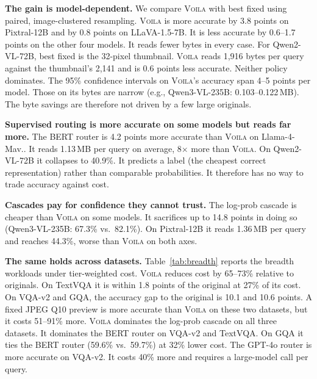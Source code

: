 \documentclass[10pt,conference]{IEEEtran}
\newcommand{\system}{\textsc{Voila}\xspace}
\newcommand{\mLlama}{Llama-4-Mav.\xspace}
\newcommand{\mLlava}{LLaVA-1.5-7B\xspace}
\newcommand{\mPix}{Pixtral-12B\xspace}
\newcommand{\mQThree}{Qwen3-VL-235B\xspace}
\newcommand{\mQSevTwo}{Qwen2-VL-72B\xspace}
\begin{document}
\textbf{The gain is model-dependent.} We compare \system with best fixed using
paired, image-clustered resampling. \system is more accurate by 3.8 points on
\mPix and by 0.8 points on \mLlava. It is less accurate by 0.6--1.7 points on
the other four models. It reads fewer bytes in every case.
For \mQSevTwo, best fixed is the 32-pixel thumbnail. \system reads 1,916 bytes
per query against the thumbnail's 2,141 and is 0.6 points less accurate.
Neither policy dominates. The 95\% confidence intervals on \system's accuracy
span 4--5 points per model. Those on its bytes are narrow (e.g., \mQThree:
0.103--0.122\,MB). The byte savings are therefore not driven by a few large
originals.

\textbf{Supervised routing is more accurate on some models but reads far
more.} The BERT router is 4.2 points more accurate than \system on \mLlama. It
reads 1.13\,MB per query on average, 8$\times$ more than \system. On
\mQSevTwo it collapses to 40.9\%. It predicts a label (the cheapest correct
representation) rather than comparable probabilities. It therefore has no way
to trade accuracy against cost.

\textbf{Cascades pay for confidence they cannot trust.} The log-prob cascade
is cheaper than \system on some models. It sacrifices up to 14.8 points in
doing so (\mQThree: 67.3\% vs.\ 82.1\%). On \mPix it reads 1.36\,MB per query
and reaches 44.3\%, worse than \system on both axes.

\textbf{The same holds across datasets.} Table~\ref{tab:breadth} reports the
breadth workloads under tier-weighted cost. \system reduces cost by 65--73\%
relative to originals. On TextVQA it is within 1.8 points of the original at
27\% of its cost. On VQA-v2 and GQA, the accuracy gap to the original is 10.1
and 10.6 points. A fixed JPEG Q10 preview is more accurate than \system on these
two datasets, but it costs 51--91\% more. \system dominates the log-prob cascade
on all three datasets. It dominates the BERT router on VQA-v2 and TextVQA. On
GQA it ties the BERT router (59.6\% vs.\ 59.7\%) at 32\% lower cost. The GPT-4o
router is more accurate on VQA-v2. It costs 40\% more and requires a
large-model call per query.
\end{document}
